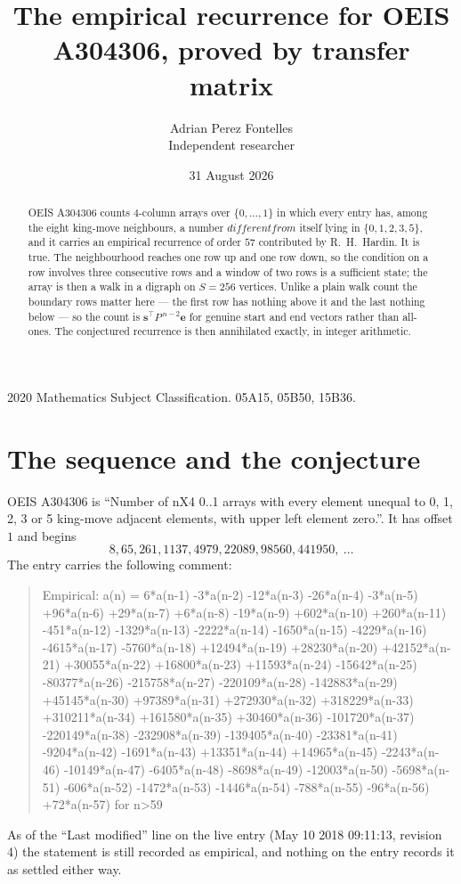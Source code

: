 \documentclass[11pt,a4paper]{article}
\title{The empirical recurrence for OEIS A304306, proved by transfer matrix}
\author{Adrian Perez Fontelles\\ \small Independent researcher}
\date{31 August 2026}
\theoremstyle{plain}
\theoremstyle{definition}
\begin{document}
\maketitle

\begin{abstract}
OEIS A304306 counts $4$-column arrays over $\{0,\dots,1\}$ in which every entry has,
among the eight king-move neighbours, a number $different from$ itself lying in $\{0,1,2,3,5\}$, and it carries an empirical
recurrence of order $57$ contributed by R.~H.~Hardin. It is true. The neighbourhood
reaches one row up and one row down, so the condition on a row involves three consecutive
rows and a window of two rows is a sufficient state; the array is then a walk in a digraph
on $S=256$ vertices. Unlike a plain walk count the boundary rows matter here --- the first
row has nothing above it and the last nothing below --- so the count is
$\mathbf{s}^{\!\top}P^{\,n-2}\mathbf{e}$ for genuine start and end vectors rather than
all-ones. The conjectured recurrence is then annihilated exactly, in integer arithmetic.
\end{abstract}

\noindent\small 2020 Mathematics Subject Classification. 05A15, 05B50, 15B36.\normalsize

\section{The sequence and the conjecture}

OEIS A304306 is ``Number of nX4 0..1 arrays with every element unequal to 0, 1, 2, 3 or 5 king-move adjacent elements, with upper left element zero.''. It has offset
$1$ and begins
\[
8, 65, 261, 1137, 4979, 22089, 98560, 441950,\ \dots
\]
The entry carries the following comment:
\begin{quote}\small
Empirical: a(n) = 6*a(n-1) -3*a(n-2) -12*a(n-3) -26*a(n-4) -3*a(n-5) +96*a(n-6) +29*a(n-7) +6*a(n-8) -19*a(n-9) +602*a(n-10) +260*a(n-11) -451*a(n-12) -1329*a(n-13) -2222*a(n-14) -1650*a(n-15) -4229*a(n-16) -4615*a(n-17) -5760*a(n-18) +12494*a(n-19) +28230*a(n-20) +42152*a(n-21) +30055*a(n-22) +16800*a(n-23) +11593*a(n-24) -15642*a(n-25) -80377*a(n-26) -215758*a(n-27) -220109*a(n-28) -142883*a(n-29) +45145*a(n-30) +97389*a(n-31) +272930*a(n-32) +318229*a(n-33) +310211*a(n-34) +161580*a(n-35) +30460*a(n-36) -101720*a(n-37) -220149*a(n-38) -232908*a(n-39) -139405*a(n-40) -23381*a(n-41) -9204*a(n-42) -1691*a(n-43) +13351*a(n-44) +14965*a(n-45) -2243*a(n-46) -10149*a(n-47) -6405*a(n-48) -8698*a(n-49) -12003*a(n-50) -5698*a(n-51) -606*a(n-52) -1472*a(n-53) -1446*a(n-54) -788*a(n-55) -96*a(n-56) +72*a(n-57) for n>59
\end{quote}
As of the ``Last modified'' line on the live entry (May 10 2018 09:11:13, revision
4) the statement is still recorded as empirical, and nothing on the entry
records it as settled either way.
\end{document}
